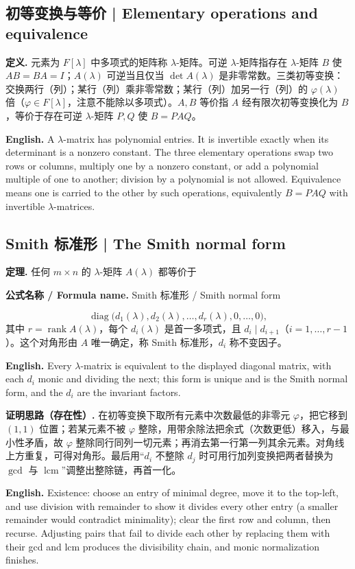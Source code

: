\documentclass[UTF8,11pt,a4paper]{ctexart}
\newcommand{\EN}[1]{\par\noindent\textbf{English.} #1\par}
\newcommand{\FORMULA}[2]{\par\noindent\textbf{公式名称 / Formula name.} #1 / #2\par}
\begin{document}
\subsection{初等变换与等价 | Elementary operations and equivalence}
\noindent\textbf{定义.} 元素为 $F[\lambda]$ 中多项式的矩阵称 $\lambda$-矩阵。可逆 $\lambda$-矩阵指存在 $\lambda$-矩阵 $B$ 使 $AB=BA=I$；$A(\lambda)$ 可逆当且仅当 $\det A(\lambda)$ 是非零常数。三类初等变换：交换两行（列）；某行（列）乘非零常数；某行（列）加另一行（列）的 $\varphi(\lambda)$ 倍（$\varphi\in F[\lambda]$，注意不能除以多项式）。$A,B$ 等价指 $A$ 经有限次初等变换化为 $B$，等价于存在可逆 $\lambda$-矩阵 $P,Q$ 使 $B=PAQ$。
\EN{A $\lambda$-matrix has polynomial entries. It is invertible exactly when its determinant is a nonzero constant. The three elementary operations swap two rows or columns, multiply one by a nonzero constant, or add a polynomial multiple of one to another; division by a polynomial is not allowed. Equivalence means one is carried to the other by such operations, equivalently $B=PAQ$ with invertible $\lambda$-matrices.}

\subsection{Smith 标准形 | The Smith normal form}
\noindent\textbf{定理.} 任何 $m\times n$ 的 $\lambda$-矩阵 $A(\lambda)$ 都等价于
\FORMULA{Smith 标准形}{Smith normal form}
\[
\operatorname{diag}\big(d_1(\lambda),d_2(\lambda),\dots,d_r(\lambda),0,\dots,0\big),
\]
其中 $r=\operatorname{rank}A(\lambda)$，每个 $d_i(\lambda)$ 是首一多项式，且 $d_i\mid d_{i+1}$（$i=1,\dots,r-1$）。这个对角形由 $A$ 唯一确定，称 Smith 标准形，$d_i$ 称不变因子。
\EN{Every $\lambda$-matrix is equivalent to the displayed diagonal matrix, with each $d_i$ monic and dividing the next; this form is unique and is the Smith normal form, and the $d_i$ are the invariant factors.}
\noindent\textbf{证明思路（存在性）.} 在初等变换下取所有元素中次数最低的非零元 $\varphi$，把它移到 $(1,1)$ 位置；若某元素不被 $\varphi$ 整除，用带余除法把余式（次数更低）移入，与最小性矛盾，故 $\varphi$ 整除同行同列一切元素；再消去第一行第一列其余元素。对角线上方重复，可得对角形。最后用“$d_i$ 不整除 $d_j$ 时可用行加列变换把两者替换为 $\gcd$ 与 $\operatorname{lcm}$”调整出整除链，再首一化。
\EN{Existence: choose an entry of minimal degree, move it to the top-left, and use division with remainder to show it divides every other entry (a smaller remainder would contradict minimality); clear the first row and column, then recurse. Adjusting pairs that fail to divide each other by replacing them with their gcd and lcm produces the divisibility chain, and monic normalization finishes.}
\end{document}
